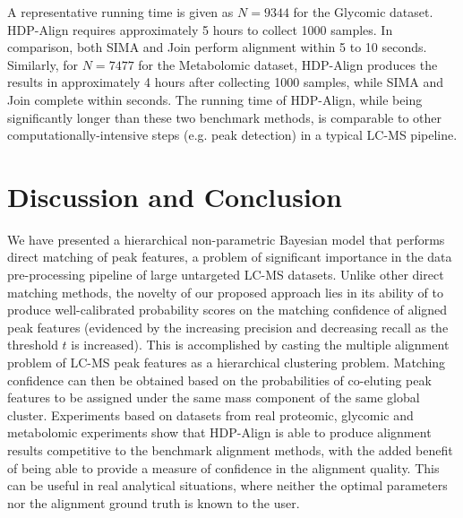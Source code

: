A representative running time is given as $N=9344$ for the Glycomic dataset. HDP-Align requires approximately 5 hours to collect 1000 samples. In comparison, both SIMA and Join perform alignment within 5 to 10 seconds. Similarly, for $N=7477$ for the Metabolomic dataset, HDP-Align produces the results in approximately 4 hours after collecting 1000 samples, while SIMA and Join complete within seconds. The running time of HDP-Align, while being significantly longer than these two benchmark methods, is comparable to other computationally-intensive steps (e.g. peak detection) in a typical LC-MS pipeline.

\section{Discussion and Conclusion}

\label{sec:conc}

We have presented a hierarchical non-parametric Bayesian model that performs direct matching of peak features, a problem of significant importance in the data pre-processing pipeline of large untargeted LC-MS datasets. Unlike other direct matching methods, the novelty of our proposed approach lies in its ability of to produce well-calibrated probability scores on the matching confidence of aligned peak features (evidenced by the increasing precision and decreasing recall as the threshold $t$ is increased). This is accomplished by casting the multiple alignment problem of LC-MS peak features as a hierarchical clustering problem. Matching confidence can then be obtained based on the probabilities of co-eluting peak features to be assigned under the same mass component of the same global cluster. Experiments based on datasets from real proteomic, glycomic and metabolomic experiments show that HDP-Align is able to produce alignment results competitive to the benchmark alignment methods, with the added benefit of being able to provide a measure of confidence in the alignment quality. This can be useful in real analytical situations, where neither the optimal parameters nor the alignment ground truth is known to the user.

